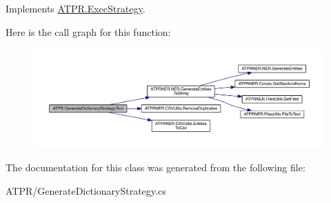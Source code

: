 Implements \hyperlink{interface_a_t_p_r_1_1_exec_strategy}{A\+T\+P\+R.\+Exec\+Strategy}.

Here is the call graph for this function\+:
\nopagebreak
\begin{figure}[H]
\begin{center}
\leavevmode
\includegraphics[width=350pt]{d2/d22/class_a_t_p_r_1_1_generate_dictionary_strategy_acec75993f2d1b9e2899130cd9dff1ffa_cgraph}
\end{center}
\end{figure}


The documentation for this class was generated from the following file\+:\begin{DoxyCompactItemize}
\item 
A\+T\+P\+R/Generate\+Dictionary\+Strategy.\+cs\end{DoxyCompactItemize}
